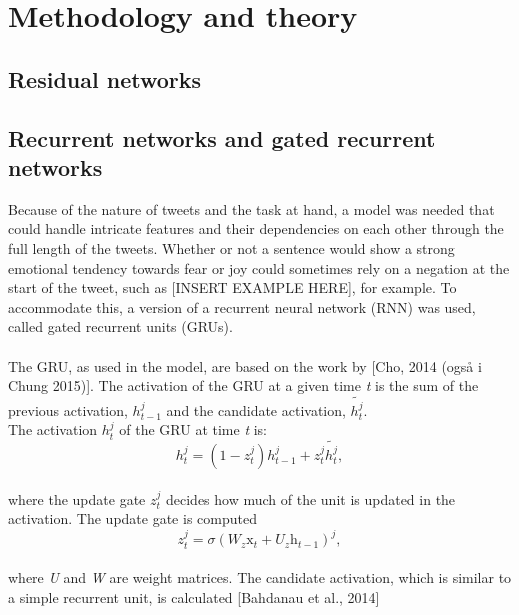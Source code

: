 
\section{Methodology and theory}

\subsection{Residual networks}

\subsection{Recurrent networks and gated recurrent networks}
Because of the nature of tweets and the task at hand, a model was needed that could handle intricate features and their dependencies on each other through the full length of the tweets. Whether or not a sentence would show a strong emotional tendency towards fear or joy could sometimes rely on a negation at the start of the tweet, such as  [INSERT EXAMPLE HERE], for example. To accommodate this, a version of a recurrent neural network (RNN) was used, called gated recurrent units (GRUs).\\
\\
The GRU, as used in the model, are based on the work by [Cho, 2014 (også i Chung 2015)]. The activation of the GRU at a given time \textit{t} is the sum of the previous activation, $h_{t-1}^{j}$ and the candidate activation, $\tilde{h_{t}^{j}}$.\\
The activation $h_{t}^{j}$ of the GRU at time \textit{t} is:\\

\begin{equation} \label{eq:activation}
h_{t}^{j} = \left(1 - z_{t}^{j}\right)h_{t-1}^{j}+z_{t}^{j}\tilde{h_{t}^{j}},
\end{equation}\\

where the update gate $z_{t}^{j}$ decides how much of the unit is updated in the activation. The update gate is computed\\

\begin{equation}\label{eq:update}
z_{t}^{j}=\sigma\left(W_{z}\mathrm{x}_{t}+U_{z}\mathrm{h}_{t-1}\right)^{j},
\end{equation}\\

where \textit{U} and \textit{W} are weight matrices. The candidate activation, which is similar to a simple recurrent unit, is calculated [Bahdanau et al., 2014]\\

